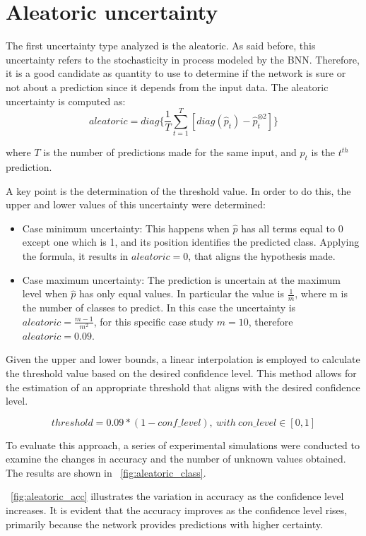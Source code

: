 \section{Aleatoric uncertainty}

The first uncertainty type analyzed is the aleatoric. As said before, this uncertainty refers to the stochasticity in process modeled by the BNN. Therefore, it is a good candidate as quantity to use to determine if the network is sure or not about a prediction since it depends from the input data. The aleatoric uncertainty is computed as:
\[
	aleatoric = diag\{\frac{1}{T} \sum_{t=1}^{T} [diag(\hat{p}_t) - \hat{p}_t^{\otimes 2}]\}
\]

where $T$ is the number of predictions made for the same input, and $p_t$ is the $t^{th}$ prediction.

A key point is the determination of the threshold value. In order to do this, the upper and lower values of this uncertainty  were determined:

\begin{itemize}
	\item Case minimum uncertainty: This happens when $\hat{p}$ has all terms equal to 0 except one which is 1, and its position identifies the predicted class. Applying the formula, it results in $aleatoric = 0$, that aligns the hypothesis made. 
	\item Case maximum uncertainty: The prediction is uncertain at the maximum level when $\hat{p}$ has only equal values. In particular the value is $\frac{1}{m}$, where m is the number of classes to predict. In this case the uncertainty is $aleatoric = \frac{m-1}{m^2}$, for this specific case study $m = 10$, therefore $aleatoric = 0.09$.
\end{itemize}

Given the upper and lower bounds, a linear interpolation is employed to calculate the threshold value based on the desired confidence level. This method allows for the estimation of an appropriate threshold that aligns with the desired confidence level. 

\[
	threshold = 0.09 * (1 - conf \_ level), \ with \ con \_ level \in [0,1]
\]


To evaluate this approach, a series of experimental simulations were conducted to examine the changes in accuracy and the number of unknown values obtained. The results are shown in \Fig~\ref{fig:aleatoric_class}.

\Fig~\ref{fig:aleatoric_acc} illustrates the variation in accuracy as the confidence level increases. It is evident that the accuracy improves as the confidence level rises, primarily because the network provides predictions with higher certainty.

